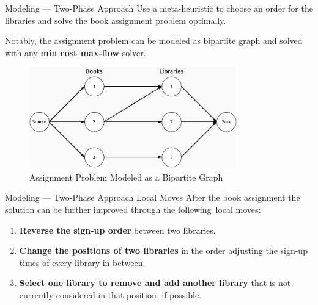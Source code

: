 \begin{frame}{Modeling --- Two-Phase Approach}
  Use a meta-heuristic to choose an order for the libraries and solve the book assignment problem optimally.

  Notably, the assignment problem can be modeled as bipartite graph and solved with any
  \textbf{min cost max-flow} solver.

  \begin{figure}[h]
    \centering
    \includegraphics[width=0.8\textwidth,keepaspectratio]{../assets/bs/bs-graph-slides.pdf}
    \caption{Assignment Problem Modeled as a Bipartite Graph}
  \end{figure}
\end{frame}

\begin{frame}{Modeling --- Two-Phase Approach Local Moves}
  After the book assignment the solution can be further improved through
  the following~\alert{local moves}:
  \begin{enumerate}
    \item \textbf{Reverse the sign-up order} between two libraries.
    \item \textbf{Change the positions of two libraries} in the order adjusting the
          sign-up times of every library in between.
    \item \textbf{Select one library to remove and add another library} that is not
          currently considered in that position, if possible.
  \end{enumerate}
\end{frame}

